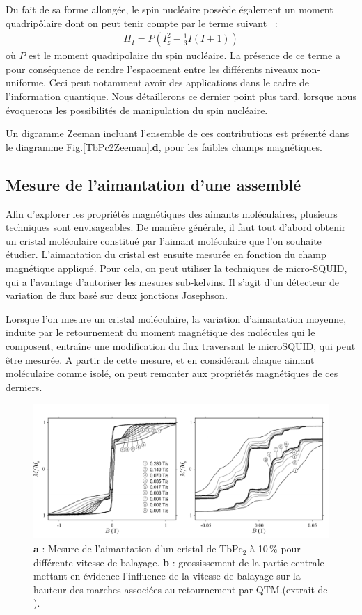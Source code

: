 Du fait de sa forme allongée, le spin nucléaire possède également un moment quadripôlaire dont on peut tenir compte par le terme suivant~\cite{Bleaney1961} :
\begin{eqnarray}
H_I = P\left(I_z^2 - \frac{1}{3}I(I+1)\right)
\end{eqnarray}
où $P$ est le moment quadripolaire du spin nucléaire. La présence de ce terme a pour conséquence de rendre l'espacement entre les différents niveaux non-uniforme. Ceci peut notamment avoir des applications dans le cadre de l'information quantique. Nous détaillerons ce dernier point plus tard, lorsque nous évoquerons les possibilités de manipulation du spin nucléaire.

Un digramme Zeeman incluant l'ensemble de ces contributions est présenté dans le diagramme Fig.\ref{TbPc2Zeeman}.\textbf{d}, pour les faibles champs magnétiques.



\subsection{Mesure de l'aimantation d'une assemblé}
Afin d'explorer les propriétés magnétiques des aimants moléculaires, plusieurs techniques sont envisageables. De manière générale, il faut tout d'abord obtenir un cristal moléculaire constitué par l'aimant moléculaire que l'on souhaite étudier. L'aimantation du cristal est ensuite mesurée en fonction du champ magnétique appliqué. Pour cela, on peut utiliser la techniques de micro-SQUID, qui a l'avantage d'autoriser les mesures sub-kelvins. Il s'agit d'un détecteur de variation de flux basé sur deux jonctions Josephson.

Lorsque l'on mesure un cristal moléculaire, la variation d'aimantation moyenne, induite par le retournement du moment magnétique des molécules qui le composent, entraîne une modification du flux traversant le microSQUID, qui peut être mesurée. A partir de cette mesure, et en considérant chaque aimant moléculaire comme isolé, on peut remonter aux propriétés magnétiques de ces derniers.

\begin{figure}
\centering \includegraphics[scale=0.45]{Resultats/MesureAimant/MesureAimant.pdf} 
\caption{\textbf{a} : Mesure de l'aimantation d'un cristal de TbPc$_2$ à 10\,\% pour différente vitesse de balayage. \textbf{b} : grossissement de la partie centrale mettant en évidence l'influence de la vitesse de balayage sur la hauteur des marches associées au retournement par QTM.(extrait de \cite{Ishikawa2005}).}
\label{TbPc2Aimantation}
\end{figure}


